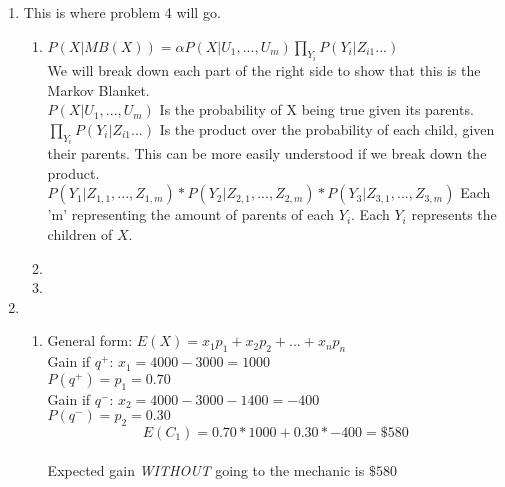 \documentclass[12pt,a4paper]{report}
\begin{document}
\begin{enumerate}
\begin{enumerate}
\end{enumerate}

\pagebreak
\item This is where problem 4 will go.
\begin{enumerate}
	\item
	$P(X|MB(X)) = \alpha P(X|U_1, ... , U_m)\prod_{Y_{i}}P(Y_i|Z_{i1}...)$\\
	We will break down each part of the right side to show that this is the Markov Blanket.\\
	$P(X|U_1, ... , U_m)$ Is the probability of X being true given its parents.\\
	$\prod_{Y_{i}}P(Y_i|Z_{i1}...)$ Is the product over the probability of each child, given their parents. This can be more easily understood if we break down the product.\\
	$P(Y_1|Z_{1,1}, ... , Z_{1,m})*P(Y_2|Z_{2,1}, ... ,Z_{2,m})*P(Y_3|Z_{3,1}, ... , Z_{3,m})$ Each 'm' representing the amount of parents of each $Y_i$. Each $Y_i$ represents the children of $X$.\\
	
	\item
	
	\item
\end{enumerate}

\pagebreak
\item
\begin{enumerate}
	\item
	General form: $E(X) = x_1p_1 + x_2p_2 + ... + x_np_n$\\
	Gain if $q^+$: $x_1 = 4000 - 3000 = 1000$\\
	$P(q^+) = p_1 = 0.70$\\
	Gain if $q^-$: $x_2 = 4000 - 3000 - 1400 = -400$\\
	$P(q^-)  = p_2 = 0.30$\\
	\[E(C_{1}) = 0.70*1000 + 0.30*-400 = \$580\]\\
	Expected gain \textit{WITHOUT} going to the mechanic is $\$580$\\
	

\end{enumerate}
\end{enumerate}
\end{document}
